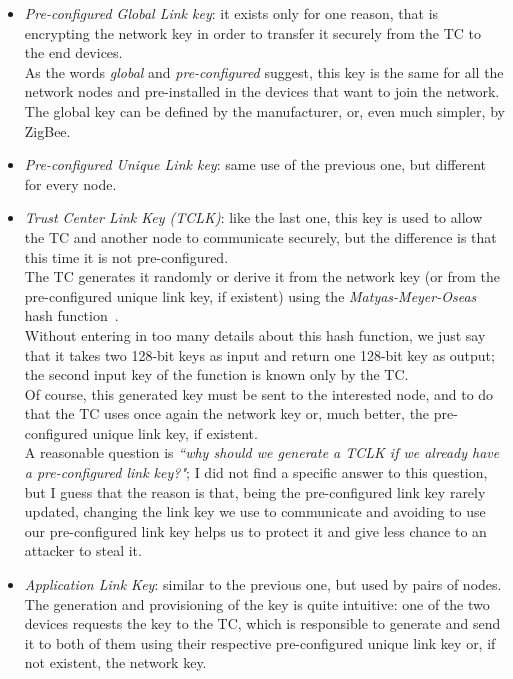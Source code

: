 \documentclass[12pt]{report}
\begin{document}
{\begin{itemize}
\begin{itemize}
\item \emph{Pre-configured Global Link key}: it exists only for one reason, that is encrypting the network key in order to transfer it securely from the TC to the end devices.\\
As the words \emph{global} and \emph{pre-configured} suggest, this key is the same for all the network nodes and pre-installed in the devices that want to join the network.\\
The global key can be defined by the manufacturer, or, even much simpler, by ZigBee.
\item \emph{Pre-configured Unique Link key}: same use of the previous one, but different for every node.
\item \emph{Trust Center Link Key (TCLK)}: like the last one, this key is used to allow the TC and another node to communicate securely, but the difference is that this time it is not pre-configured.\\
The TC generates it randomly or derive it from the network key (or from the pre-configured unique link key, if existent) using the \emph{Matyas-Meyer-Oseas} hash function~\cite{onewaycompressionfunc}.\\ 
Without entering in too many details about this hash function, we just say that it takes two 128-bit keys as input and return one 128-bit key as output; the second input key of the function is known only by the TC.\\
Of course, this generated key must be sent to the interested node, and to do that the TC uses once again the network key or, much better, the pre-configured unique link key, if existent.\\

A reasonable question is \emph{``why should we generate a TCLK if we already have a pre-configured link key?"}; I did not find a specific answer to this question, but I guess that the reason is that, being the pre-configured link key rarely updated, changing the link key we use to communicate and avoiding to use our pre-configured link key helps us to protect it and give less chance to an attacker to steal it.
\item \emph{Application Link Key}: similar to the previous one, but used by pairs of nodes.\\
The generation and provisioning of the key is quite intuitive: one of the two devices requests the key to the TC, which is responsible to generate and send it to both of them using their respective pre-configured unique link key or, if not existent, the network key.
\end{itemize}


\end{itemize}}
\end{document}
